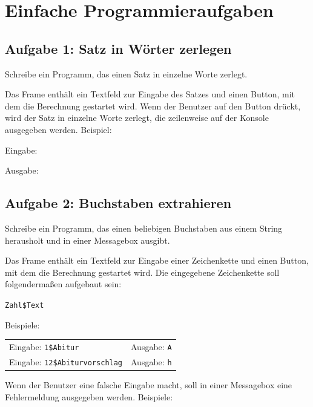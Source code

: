 \section{Einfache Programmieraufgaben}

\subsection{Aufgabe 1: Satz in Wörter zerlegen}

Schreibe ein Programm, das einen Satz in einzelne Worte zerlegt. 

Das Frame enthält ein Textfeld zur Eingabe des Satzes und einen Button, mit dem
die Berechnung gestartet wird. Wenn der Benutzer auf den Button drückt, wird
der Satz in einzelne Worte zerlegt, die zeilenweise auf der Konsole ausgegeben
werden. Beispiel:

Eingabe:


Ausgabe:

\linebreak
{}\linebreak
{}\linebreak 
{}\linebreak 
{}

\subsection{Aufgabe 2: Buchstaben extrahieren}

Schreibe ein Programm, das einen beliebigen Buchstaben aus einem String
herausholt und in einer Messagebox ausgibt.

Das Frame enthält ein Textfeld zur Eingabe einer Zeichenkette und einen Button,
mit dem die Berechnung gestartet wird. Die eingegebene Zeichenkette soll
folgendermaßen aufgebaut sein:

\lstinline|Zahl$Text|

Beispiele:

\bgroup
\def\arraystretch{1.2}
\begin{tabularx}{\textwidth}{p{50mm} X}
Eingabe: \lstinline|1$Abitur| &
Ausgabe: \lstinline|A| \\
Eingabe: \lstinline|12$Abiturvorschlag| &
Ausgabe: \lstinline|h| \\
\end{tabularx}
\egroup

Wenn der Benutzer eine falsche Eingabe macht, soll in einer Messagebox eine
Fehlermeldung ausgegeben werden. Beispiele:


